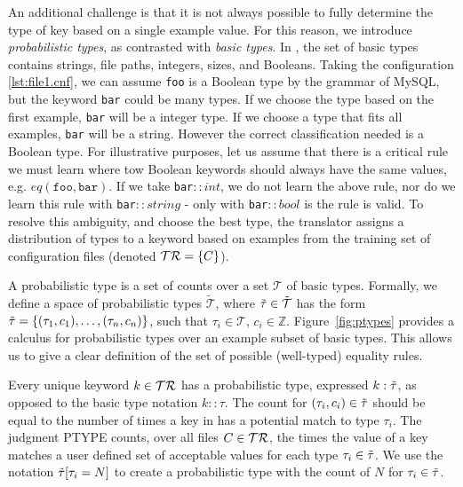 An additional challenge is that it is not always possible to fully determine the type of key based on a single example value. 
For this reason, we introduce \textit{probabilistic types}, as contrasted with \textit{basic types}.
In \app, the set of basic types contains strings, file paths, integers, sizes, and Booleans. 
Taking the configuration \ref{lst:file1.cnf}, we can assume {\tt foo} is a Boolean type by the grammar of MySQL,
  but the keyword {\tt bar} could be many types.
If we choose the type based on the first example, {\tt bar} will be a integer type.
If we choose a type that fits all examples, {\tt bar} will be a string.
However the correct classification needed is a Boolean type.
For illustrative purposes, let us assume that there is a critical rule we must learn where tow Boolean keywords should always have the same values, e.g. $eq(\texttt{foo},\texttt{bar})$.
If we take {\tt bar}$::int$, we do not learn the above rule, nor do we learn this rule with {\tt bar}$::string$ - only with {\tt bar}$::bool$ is the rule is valid.
To resolve this ambiguity, and choose the best type, the translator assigns a distribution of types to a keyword based on examples from the training set of configuration files (denoted $\mathcal{TR}=\{C\}$).
 

A probabilistic type is a set of counts over a set $\mathcal{T}$ of basic types.
Formally, we define a space of probabilistic types $\tilde{\mathcal{T}}$, where $\tilde{\tau} \in \tilde{\mathcal{T}}$ has the form $\tilde{\tau}=\{(\tau_1, c_1),\ldots,(\tau_n, c_n)\}$, such that $\tau_i \in \mathcal{T}$, $c_i \in \mathbb{Z}$. 
Figure~\ref{fig:ptypes} provides a calculus for probabilistic types over an example subset of basic types.
This allows us to give a clear definition of the set of possible (\ie well-typed) equality rules.

Every unique keyword $k \in \mathcal{TR}$ has a probabilistic type, expressed $k:\tilde{\tau}$, as opposed to the basic type notation $k::\tau$.
The count for $(\tau_i,c_i) \in \tilde{\tau}$ should be equal to the number of times a key in \trainingSet has a potential match to type $\tau_i$.
The judgment {\scriptsize PTYPE} counts, over all files $C \in \mathcal{TR}$, the times the value of a key matches a user defined set of acceptable values for each type $\tau_i \in \tilde{\tau}$.
We use the notation $\tilde{\tau}[\tau_i=N]$ to create a probabilistic type with the count of $N$ for $\tau_i \in \tilde{\tau}$.

